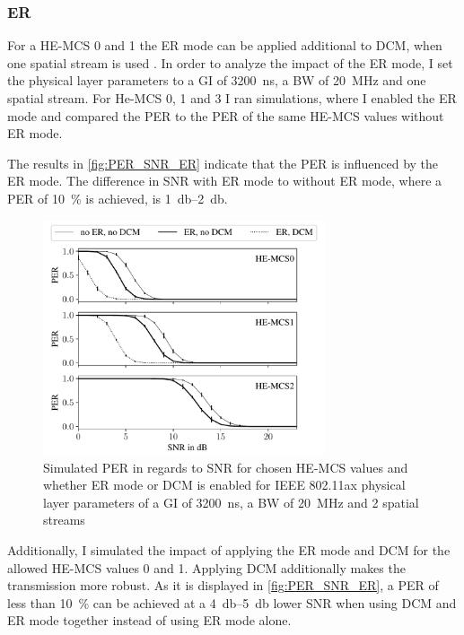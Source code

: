 \subsubsection*{\acf{ER}}
For a \ac{HE}-\ac{MCS} \num{0} and \num{1} the \ac{ER} mode can be applied additional to \ac{DCM}, when one spatial stream is used \cite{ieee_standard_2021ax}.
In order to analyze the impact of the \ac{ER} mode, I set the physical layer parameters to a \ac{GI} of
\SI{3200}{\nano\second}, a \ac{BW} of \SI{20}{\mega\hertz} and one spatial stream.
For He-\ac{MCS} \num{0}, \num{1} and \num{3} I ran simulations, where I enabled the
\ac{ER} mode and compared the \ac{PER} to the \ac{PER} of the same \ac{HE}-\ac{MCS} values without \ac{ER} mode.

The results in \autoref{fig:PER_SNR_ER} indicate that the \ac{PER} is influenced by the \ac{ER} mode.
The difference in \ac{SNR} with \ac{ER} mode to without \ac{ER} mode, where a \ac{PER}
of \SI{10}{\percent} is achieved, is \SIrange{1}{2}{\decibel}.

\begin{figure}%
   \centering
   \includegraphics[width=0.74\textwidth]{figures/ER_PER_to_SNR.pdf}
   \caption{Simulated \ac{PER} in regards to \ac{SNR} for chosen \ac{HE}-\ac{MCS} values and whether \acf{ER} mode or \acf{DCM}
   is enabled for IEEE 802.11ax physical layer parameters of a \ac{GI} of \SI{3200}{\nano\second}, a \ac{BW} of \SI{20}{\mega\hertz} and 2 spatial streams}
   \label{fig:PER_SNR_ER}%
\end{figure}

Additionally, I simulated the impact of applying the \ac{ER} mode and \ac{DCM} for the allowed \ac{HE}-\ac{MCS} values \num{0} and \num{1}.
Applying \ac{DCM} additionally makes the transmission more robust.
As it is displayed in \autoref{fig:PER_SNR_ER},
a \ac{PER} of less than \SI{10}{\percent} can be achieved at a \SIrange{4}{5}{\decibel} lower \ac{SNR} when using \ac{DCM} and \ac{ER} mode together instead
of using \ac{ER} mode alone.

